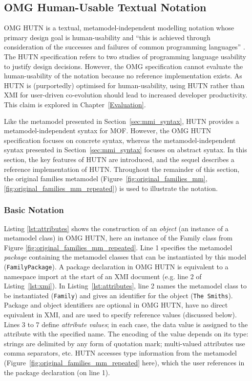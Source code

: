 \subsection{OMG Human-Usable Textual Notation}
\label{subsec:hutn}
OMG HUTN is a textual, metamodel-independent modelling notation whose primary design goal is human-usability and ``this is achieved through consideration of the successes and failures of common programming languages'' \cite[Section 2.2]{hutn}. The HUTN specification refers to two studies of programming language usability to justify design decisions. However, the OMG specification cannot evaluate the human-usability of the notation because no reference implementation exists. As HUTN is (purportedly) optimised for human-usability, using HUTN rather than XMI for user-driven co-evolution should lead to increased developer productivity. This claim is explored in Chapter~\ref{Evaluation}.

Like the metamodel presented in Section~\ref{sec:mmi_syntax}, HUTN provides a me\-ta\-mo\-del-ind\-ep\-en\-de\-nt syntax for MOF. However, the OMG HUTN specification focuses on concrete syntax, whereas the metamodel-independent syntax presented in Section~\ref{sec:mmi_syntax} focuses on abstract syntax. In this section, the key features of HUTN are introduced, and the sequel describes a reference implementation of HUTN. Throughout the remainder of this section, the original families metamodel (Figure~\ref{fig:original_families_mm}, \ref{fig:original_families_mm_repeated}) is used to illustrate the notation.


\subsubsection{Basic Notation}
Listing \ref{lst:attributes} shows the construction of an \emph{object} (an instance of a metamodel class) in OMG HUTN, here an instance of the Family class from Figure \ref{fig:original_families_mm_repeated}. Line 1 specifies the metamodel \emph{package} containing the metamodel classes that can be instantiated by this model (\texttt{Fa\-mi\-lyPa\-ck\-a\-ge}). A package declaration in OMG HUTN is equivalent to a namespace import at the start of an XMI document (e.g. line 2 of Listing~\ref{lst:xmi}). In Listing~\ref{lst:attributes}, line 2 names the metamodel class to be instantiated (\texttt{Fa\-mi\-ly}) and gives an identifier for the object (\texttt{The Sm\-it\-hs}). Package and object identifiers are optional in OMG HUTN, have no direct equivalent in XMI, and are used to specify reference values (discussed below). Lines 3 to 7 define \emph{attribute values}; in each case, the data value is assigned to the attribute with the specified name. The encoding of the value depends on its type: strings are delimited by any form of quotation mark; multi-valued attributes use comma separators, etc. HUTN accesses type information from the metamodel (Figure~\ref{fig:original_families_mm_repeated} here), which the user references in the package declaration (on line 1).

